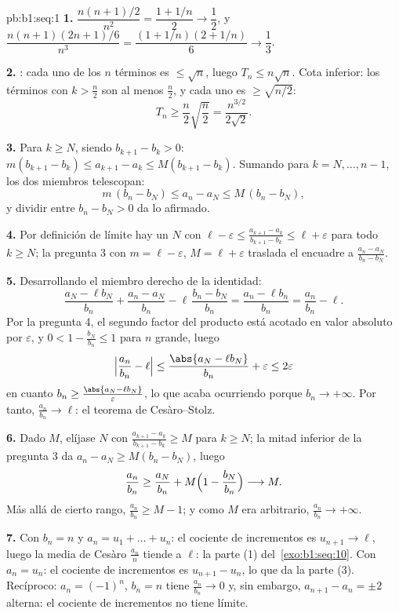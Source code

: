 \begin{solution}{pb:b1:seq:1}
\textbf{1.} $\dfrac{n(n+1)/2}{n^2} = \dfrac{1 + 1/n}{2} \to \dfrac12$,
y $\dfrac{n(n+1)(2n+1)/6}{n^3} = \dfrac{(1 + 1/n)(2 + 1/n)}{6} \to
\dfrac13$.

\textbf{2.} : cada uno de los $n$ términos es
$\leq \sqrt n$, luego $T_n \leq n\sqrt n$. Cota inferior: los términos
con $k > \frac n2$ son al menos $\frac n2$, y cada uno es
$\geq \sqrt{n/2}$:
\[
T_n \geq \frac n2 \sqrt{\frac n2} = \frac{n^{3/2}}{2\sqrt 2} .
\]

\textbf{3.} Para $k \geq N$, siendo $b_{k+1} - b_k > 0$:
$m(b_{k+1} - b_k) \leq a_{k+1} - a_k \leq M(b_{k+1} - b_k)$. Sumando
para $k = N, \dots, n - 1$, los dos miembros telescopan:
\[
m\,(b_n - b_N) \leq a_n - a_N \leq M\,(b_n - b_N),
\]
y dividir entre $b_n - b_N > 0$ da lo afirmado.

\textbf{4.} Por definición de límite hay un $N$ con
$\ell - \varepsilon \leq \frac{a_{k+1} - a_k}{b_{k+1} - b_k} \leq
\ell + \varepsilon$ para todo $k \geq N$; la pregunta 3 con
$m = \ell - \varepsilon$, $M = \ell + \varepsilon$ traslada el
encuadre a $\frac{a_n - a_N}{b_n - b_N}$.

\textbf{5.} Desarrollando el miembro derecho de la identidad:
\[
\frac{a_N - \ell b_N}{b_n} + \frac{a_n - a_N}{b_n} -
\ell\,\frac{b_n - b_N}{b_n}
= \frac{a_n - \ell b_n}{b_n} = \frac{a_n}{b_n} - \ell .
\]
Por la pregunta 4, el segundo factor del producto está acotado en
valor absoluto por $\varepsilon$, y $0 < 1 - \frac{b_N}{b_n} \leq 1$
para $n$ grande, luego
\[
\Bigl|\frac{a_n}{b_n} - \ell\Bigr|
\leq \frac{\abs{a_N - \ell b_N}}{b_n} + \varepsilon
\leq 2\varepsilon
\]
en cuanto $b_n \geq \frac{\abs{a_N - \ell b_N}}{\varepsilon}$, lo que
acaba ocurriendo porque $b_n \to +\infty$. Por tanto,
$\frac{a_n}{b_n} \to \ell$: el teorema de Cesàro--Stolz.

\textbf{6.} Dado $M$, elíjase $N$ con $\frac{a_{k+1} - a_k}{b_{k+1} -
b_k} \geq M$ para $k \geq N$; la mitad inferior de la pregunta 3 da
$a_n - a_N \geq M(b_n - b_N)$, luego
\[
\frac{a_n}{b_n} \geq \frac{a_N}{b_n} +
M\Bigl(1 - \frac{b_N}{b_n}\Bigr) \longrightarrow M .
\]
Más allá de cierto rango, $\frac{a_n}{b_n} \geq M - 1$; y como $M$ era
arbitrario, $\frac{a_n}{b_n} \to +\infty$.

\textbf{7.} Con $b_n = n$ y $a_n = u_1 + \dots + u_n$: el cociente de
incrementos es $u_{n+1} \to \ell$, luego la media de Cesàro
$\frac{a_n}{n}$ tiende a $\ell$: la parte (1)
del~\cref{exo:b1:seq:10}. Con $a_n = u_n$: el cociente de incrementos
es $u_{n+1} - u_n$, lo que da la parte (3). Recíproco:
$a_n = (-1)^n$, $b_n = n$ tiene $\frac{a_n}{b_n} \to 0$ y, sin
embargo, $a_{n+1} - a_n = \pm 2$ alterna: el cociente de incrementos
no tiene límite.


\end{solution}
